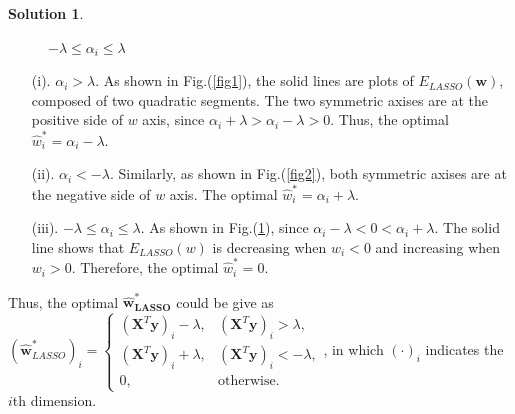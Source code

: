 \documentclass[a4paper,UTF8]{article}
\numberwithin{equation}{section}
\theoremstyle{definition}
\newtheorem*{solution}{Solution}
\begin{document}
\begin{solution}
\begin{figure}[h!]
\begin{minipage}[t]{0.3\linewidth}
     \caption{$-\lambda\leq\alpha_i\leq\lambda$}\label{fig3}
\end{minipage}
\end{figure}
\begin{itemize}
\item[(i).] $\alpha_i>\lambda$. As shown in Fig.(\ref{fig1}), the solid lines are plots of $E_{LASSO}(\bm{w})$, composed of two quadratic segments. The two symmetric axises are at the positive side of $w$ axis, since $\alpha_i+\lambda>\alpha_i-\lambda>0$. Thus, the optimal $\hat{w}_i^*=\alpha_i-\lambda$.
\item[(ii).] $\alpha_i<-\lambda$. Similarly, as shown in Fig.(\ref{fig2}), both symmetric axises are at the negative side of $w$ axis. The optimal $\hat{w}_i^*=\alpha_i+\lambda$.
\item[(iii).] $-\lambda\leq\alpha_i\leq\lambda$. As shown in Fig.(\ref{fig3}), since $\alpha_i-\lambda<0<\alpha_i+\lambda$. The solid line shows that $E_{LASSO}(w)$ is decreasing when $w_i<0$ and increasing when $w_i>0$. Therefore, the optimal $\hat{w}_i^*=0$.
\end{itemize}
Thus, the optimal $\bm{\hat{w}_{LASSO}^*}$ could be give as ${(\bm{\hat{w}}_{LASSO}^*)_i}=\left\{ \begin{array}{ll} (\bm{X}^T\bm{y})_i-\lambda, & (\bm{X}^T\bm{y})_i>\lambda, \\ (\bm{X}^T\bm{y})_i+\lambda, & (\bm{X}^T\bm{y})_i<-\lambda, \\ 0, & \text{otherwise}. \end{array}\right.$, in which $(\cdot)_i$ indicates the $i$th dimension.


\end{solution}
\end{document}
